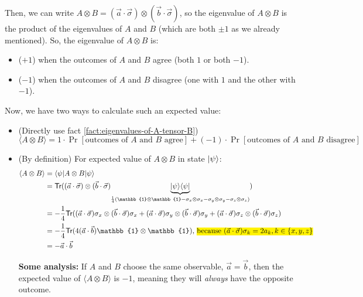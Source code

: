 \documentclass[12pt]{article}
\begin{document}
\begin{fact}\label{fact:eigenvalues-of-A-tensor-B}
\noindent Then, we can write $A\otimes B = (\vec{a}\cdot \vec{\sigma}) \otimes (\vec{b}\cdot \vec{\sigma})$, so the eigenvalue of $A\otimes B$ is the product of the eigenvalues of $A$ and $B$ (which are both $\pm 1$ as we already mentioned). So, the eigenvalue of $A\otimes B$ is:
\begin{itemize}
    \item ($+1$) when the outcomes of $A$ and $B$ agree (both $1$ or both $-1$).
    \item ($-1$) when the outcomes of $A$ and $B$ disagree (one with $1$ and the other with $-1$).
\end{itemize}
\end{fact}

\begin{definition}\label{def:exp-value-A-tensor-B}
Now, we have two ways to calculate such an expected value:
\begin{itemize}
    \item (Directly use fact \ref{fact:eigenvalues-of-A-tensor-B}) $$
        \langle A\otimes B \rangle = 1\cdot \Pr[\text{outcomes of $A$ and $B$ agree}] + (-1) \cdot \Pr[\text{outcomes of $A$ and $B$ disagree}]
    $$
    \item (By definition) For expected value of $A\otimes B$ in state $\Ket{\psi}$: $$
    \begin{aligned}
    \langle A\otimes B \rangle
        &= \Bra{\psi} A\otimes B\Ket{\psi}\\
        &= \Trace{(\vec{a}\cdot\vec{\sigma})\otimes (\vec{b}\cdot\vec{\sigma})\underset{\frac{1}{4}(\mathbb{1}\otimes \mathbb{1} - \sigma_x \otimes \sigma_x - \sigma_y \otimes \sigma_y - \sigma_z \otimes \sigma_z)}{\underbrace{\kb{\psi}{\psi}}}} \\
        &= -\frac{1}{4}\Trace{(\vec{a}\cdot \vec{\sigma})\sigma_x \otimes (\vec{b}\cdot \vec{\sigma})\sigma_x + (\vec{a}\cdot \vec{\sigma})\sigma_y \otimes (\vec{b}\cdot \vec{\sigma})\sigma_y + (\vec{a}\cdot \vec{\sigma})\sigma_z \otimes (\vec{b}\cdot \vec{\sigma})\sigma_z}\\
        &= -\frac{1}{4}\Trace{4(\vec{a}\cdot \vec{b})\mathbb{1}\otimes \mathbb{1}}\text{, \hl{because $(\vec{a}\cdot \vec{\sigma})\sigma_k = 2a_k,k\in \{x,y,z\}$}}\\
        &= - \vec{a}\cdot \vec{b}
    \end{aligned}
    $$

    \textbf{Some analysis:} If $A$ and $B$ choose the same observable, $\vec{a} = \vec{b}$, then the expected value of $\langle A\otimes B \rangle$ is $-1$, meaning they will \textit{always} have the opposite outcome.
\end{itemize}
\end{definition}
\end{document}
